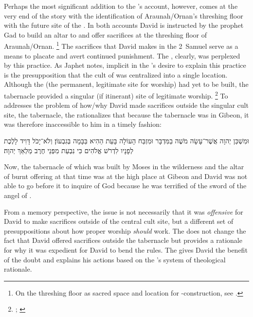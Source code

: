 Perhaps the most significant addition to the \chronicler's account, however, comes at the very end of the story with the identification of Araunah/Ornan's threshing floor with the future site of the \jerusalemtemple. In both accounts David is instructed by the prophet Gad to build an altar to \yahweh and offer sacrifices at the threshing floor of Araunah/Ornan.%
    \footnote{On the threshing floor as  sacred space and location for \temple-construction, see 
        \cite[125--144]{waters2015}.}
The sacrifices that David makes in the 2~Samuel serve as a means to placate \yahweh and avert continued punishment. The \chronicler, clearly, was perplexed by this practice. As Japhet notes, implicit in the \chronicler's desire to explain this practice is the presupposition that the cult of \yahweh was centralized into a single location. Although the \temple (the permanent, legitimate site for worship) had yet to be built, the tabernacle provided a singular (if itinerant) site of legitimate worship.%
    \footnote{\cite[389]{japhet1993}; \cite[760--761]{knoppers2007}}
To addresses the problem of how/why David made sacrifices outside the singular cult site, the tabernacle, the \chronicler rationalizes that because the tabernacle was in Gibeon, it was therefore inaccessible to him in a timely fashion:
\begin{hebrewtext}
    וּמִשְׁכַּן יְהוָה אֲשֶׁר־עָשָׂה מֹשֶׁה בַמִּדְבָּר וּמִזְבַּח הָעוֹלָה בָּעֵת הַהִיא בַּבָּמָה בְּגִבְעוֹן׃ 
    וְלֹא־יָכֹל דָּוִיד לָלֶכֶת לְפָנָיו לִדְרֹשׁ אֱלֹהִים כִּי נִבְעַת מִפְּנֵי חֶרֶב מַלְאַךְ יְהוָה׃
\end{hebrewtext}
\begin{translation}
    Now, the tabernacle of \yahweh which was built by Moses in the wilderness and the altar of burnt offering at that time was at the high place at Gibeon
    and David was not able to go before it to inquire of God because he was terrified of the sword of the angel of \yahweh.
\end{translation}
\noindent
From a memory perspective, the issue is not necessarily that it was \emph{offensive} for David to make sacrifices outside of the central cult site, but a different set of presuppositions about how proper worship \emph{should} work. The \chronicler does not change the fact that David offered sacrifices outside the tabernacle but provides a rationale for why it was expedient for David to bend the rules. The \chronicler gives David the benefit of the doubt and explains his actions based on the \chronicler's system of theological rationale.

